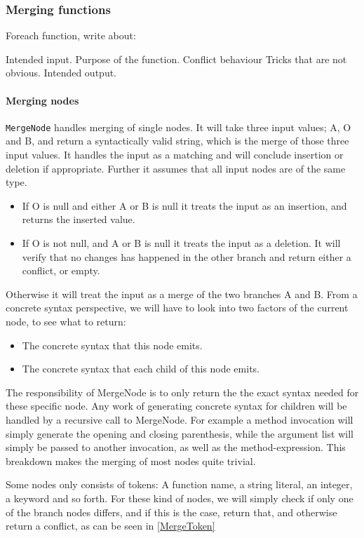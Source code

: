 \documentclass[11pt]{article}
\begin{document}
\subsubsection{Merging functions}
Foreach function, write about:

Intended input.
Purpose of the function.
Conflict behaviour
Tricks that are not obvious.
Intended output.

\paragraph{Merging nodes}
\texttt{MergeNode} handles merging of single nodes. It will take three input values; A, O and B, and return a syntactically valid string, which is the merge of those three input values. It handles the input as a matching and will conclude insertion or deletion if appropriate. Further it assumes that all input nodes are of the same type.

\begin{itemize}
	\item If O is null and either A or B is null it treats the input as an insertion, and returns the inserted value.
	\item If O is not null, and A or B is null it treats the input as a deletion. It will verify that no changes has happened in the other branch and return either a conflict, or empty.
\end{itemize}

Otherwise it will treat the input as a merge of the two branches A and B. From a concrete syntax perspective, we will have to look into two factors of the current node, to see what to return:

\begin{itemize}
	\item The concrete syntax that this node emits.
	\item The concrete syntax that each child of this node emits.
\end{itemize}

The responsibility of MergeNode is to only return the the exact syntax needed for these specific node. Any work of generating concrete syntax for children will be handled by a recursive call to MergeNode. For example a method invocation will simply generate the opening and closing parenthesis, while the argument list will simply be passed to another invocation, as well as the method-expression. This breakdown makes the merging of most nodes quite trivial.

Some nodes only consists of tokens: A function name, a string literal, an integer, a keyword and so forth. For these kind of nodes, we will simply check if only one of the branch nodes differs, and if this is the case, return that, and otherwise return a conflict, as can be seen in \ref{MergeToken}
\end{document}
